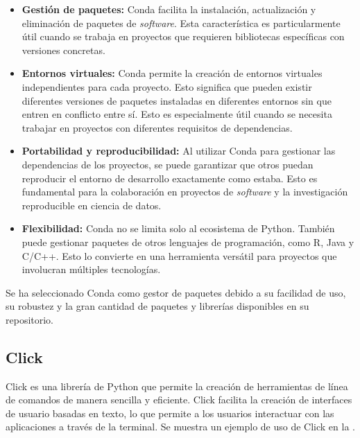 \begin{itemize}
	\item \textbf{Gestión de paquetes:} Conda facilita la instalación, actualización y eliminación de paquetes de \textit{software}. Esta característica es particularmente útil cuando se trabaja en proyectos que requieren bibliotecas específicas con versiones concretas.

	\item \textbf{Entornos virtuales:} Conda permite la creación de entornos virtuales independientes para cada proyecto. Esto significa que pueden existir diferentes versiones de paquetes instaladas en diferentes entornos sin que entren en conflicto entre sí. Esto es especialmente útil cuando se necesita trabajar en proyectos con diferentes requisitos de dependencias.

	\item \textbf{Portabilidad y reproducibilidad:} Al utilizar Conda para gestionar las dependencias de los proyectos, se puede garantizar que otros puedan reproducir el entorno de desarrollo exactamente como estaba. Esto es fundamental para la colaboración en proyectos de \textit{software} y la investigación reproducible en ciencia de datos.

	\item \textbf{Flexibilidad:} Conda no se limita solo al ecosistema de Python. También puede gestionar paquetes de otros lenguajes de programación, como R, Java y C/C++. Esto lo convierte en una herramienta versátil para proyectos que involucran múltiples tecnologías.
\end{itemize}

Se ha seleccionado Conda como gestor de paquetes debido a su facilidad de uso, su robustez y la gran cantidad de paquetes y librerías disponibles en su repositorio.

\subsection{Click}
Click es una librería de Python que permite la creación de herramientas de línea de comandos de manera sencilla y eficiente. Click facilita la creación de interfaces de usuario basadas en texto, lo que permite a los usuarios interactuar con las aplicaciones a través de la terminal. Se muestra un ejemplo de uso de Click en la .

